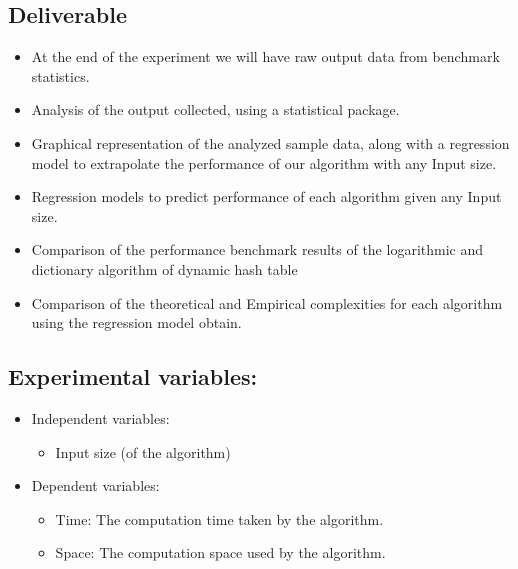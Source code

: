 \documentclass[a4paper,12pt, openany]{book}
\begin{document}
\subsection{Deliverable} 
\begin{itemize} 
	\item At the end of the experiment we will have raw output data from benchmark statistics. 
	\item Analysis of the output collected, using a statistical package.
	\item Graphical representation of the analyzed sample data, along with a regression model to extrapolate the performance of our algorithm with any Input size.
	\item Regression models to predict performance of each algorithm given any Input size.
	
	\item Comparison of the performance benchmark results of the  logarithmic and dictionary algorithm of dynamic hash table
	
	\item Comparison of the theoretical and  Empirical complexities for each algorithm using the regression model obtain.
\end{itemize}



\subsection{Experimental variables:}
\begin{itemize}
	\item Independent variables: \begin{itemize}
		\item Input size (of the algorithm)
	\end{itemize}
	
	\item Dependent variables:\begin{itemize}
		\item Time: The computation time taken by the algorithm.
		\item Space: The computation space used by the algorithm.
	\end{itemize}
	
\end{itemize}
\end{document}
